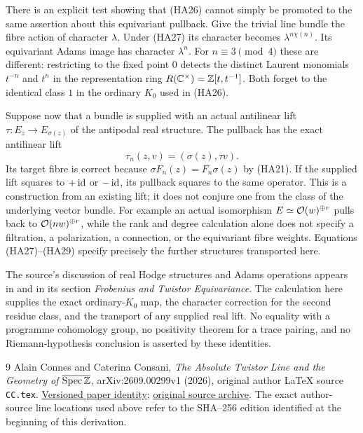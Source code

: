 There is an explicit test showing that (HA26) cannot simply be promoted
to the same assertion about this equivariant pullback. Give the trivial
line bundle the fibre action of character $\lambda$. Under (HA27) its
character becomes $\lambda^{n\chi(n)}$. Its equivariant Adams image
has character $\lambda^n$. For $n\equiv3\pmod4$ these are different:
restricting to the fixed point $0$ detects the distinct Laurent monomials
$t^{-n}$ and $t^n$ in the representation ring
$R(\mathbb C^\times)=\mathbb Z[t,t^{-1}]$. Both forget to the identical class $1$
in the ordinary $K_0$ used in (HA26).

Suppose now that a bundle is supplied with an actual antilinear lift
$\tau:E_z\to E_{\sigma(z)}$ of the antipodal real structure. The
pullback has the exact antilinear lift
\begin{equation}\tag{HA29}
 \tau_n(z,v)=(\sigma(z),\tau v).
\end{equation}
Its target fibre is correct because
$\sigma F_n(z)=F_n\sigma(z)$ by (HA21).
If the supplied lift squares to $+\operatorname{id}$ or $-\operatorname{id}$, its pullback squares
to the same operator. This is a construction from an existing lift;
it does not conjure one from the class of the underlying vector bundle.
For example an actual isomorphism $E\simeq\mathcal O(w)^{\oplus r}$ pulls back
to $\mathcal O(nw)^{\oplus r}$, while the rank and degree calculation alone
does not specify a filtration, a polarization, a connection, or the
equivariant fibre weights. Equations (HA27)--(HA29) specify precisely
the further structures transported here.

The source's discussion of real Hodge structures and Adams operations
appears in  and in its section \emph{Frobenius and
Twistor Equivariance}. The calculation here supplies the exact
ordinary-$K_0$ map, the character correction for the second residue
class, and the transport of any supplied real lift. No equality with a
programme cohomology group, no positivity theorem for a trace pairing,
and no Riemann-hypothesis conclusion is asserted by these identities.

\begin{thebibliography}{9}
Alain Connes and Caterina Consani,
\emph{The Absolute Twistor Line and the Geometry of
$\overline{\operatorname{Spec}\mathbb Z}$},
arXiv:2609.00299v1 (2026), original author LaTeX source
\nolinkurl{CC.tex}.
\href{https://arxiv.org/abs/2609.00299v1}{Versioned paper identity};
\href{https://arxiv.org/src/2609.00299v1}{original source archive}.
The exact author-source line locations used above refer to the SHA--256
edition identified at the beginning of this derivation.
\end{thebibliography}
